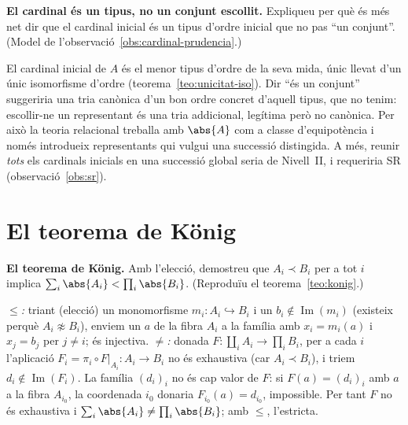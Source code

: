 \begin{exercici}
\textbf{El cardinal és un tipus, no un conjunt escollit.} Expliqueu per què és més net dir que el cardinal inicial és un tipus d'ordre inicial que no pas \enquote{un conjunt}. (Model de l'observació~\ref{obs:cardinal-prudencia}.)
\end{exercici}
\begin{solucio}
El cardinal inicial de \(A\) és el menor tipus d'ordre de la seva mida, únic llevat d'un únic isomorfisme d'ordre (teorema~\ref{teo:unicitat-iso}). Dir \enquote{és un conjunt} suggeriria una tria canònica d'un bon ordre concret d'aquell tipus, que no tenim: escollir-ne un representant és una tria addicional, legítima però no canònica. Per això la teoria relacional treballa amb \(\abs{A}\) com a classe d'equipotència i només introdueix representants qui vulgui una successió distingida. A més, reunir \emph{tots} els cardinals inicials en una successió global seria de Nivell~II, i requeriria SR (observació~\ref{obs:sr}).
\end{solucio}

\section{El teorema de König}\label{prac:konig}

\begin{exercici}
\textbf{El teorema de König.} Amb l'elecció, demostreu que \(A_i\prec B_i\) per a tot \(i\) implica \(\sum_i\abs{A_i}<\prod_i\abs{B_i}\). (Reproduïu el teorema~\ref{teo:konig}.)
\end{exercici}
\begin{solucio}
\emph{\(\le\):} triant (elecció) un monomorfisme \(m_i\colon A_i\hookrightarrow B_i\) i un \(b_i\notin\operatorname{Im}(m_i)\) (existeix perquè \(A_i\not\approx B_i\)), enviem un \(a\) de la fibra \(A_i\) a la família amb \(x_i=m_i(a)\) i \(x_j=b_j\) per \(j\ne i\); és injectiva. \emph{\(\neq\):} donada \(F\colon\coprod_i A_i\to\prod_i B_i\), per a cada \(i\) l'aplicació \(F_i=\pi_i\circ F|_{A_i}\colon A_i\to B_i\) no és exhaustiva (car \(A_i\prec B_i\)), i triem \(d_i\notin\operatorname{Im}(F_i)\). La família \((d_i)_i\) no és cap valor de \(F\): si \(F(a)=(d_i)_i\) amb \(a\) a la fibra \(A_{i_0}\), la coordenada \(i_0\) donaria \(F_{i_0}(a)=d_{i_0}\), impossible. Per tant \(F\) no és exhaustiva i \(\sum_i\abs{A_i}\neq\prod_i\abs{B_i}\); amb \(\le\), l'estricta.
\end{solucio}

